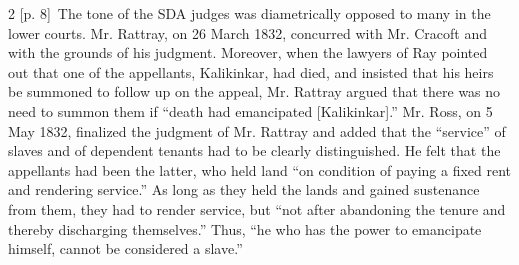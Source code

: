 \documentclass[10pt,a4paper]{article}
\begin{document}
\begin{paracol}{2}
\switchcolumn
{\scriptsize\color{gray} [p. 8]}\ The tone of the SDA judges was diametrically opposed to many in the lower courts. Mr. Rattray, on 26 March 1832, concurred with Mr. Cracoft and with the grounds of his judgment. Moreover, when the lawyers of Ray pointed out that one of the appellants, Kalikinkar, had died, and insisted that his heirs be summoned to follow up on the appeal, Mr. Rattray argued that there was no need to summon them if “death had emancipated [Kalikinkar].” Mr. Ross, on 5 May 1832, finalized the judgment of Mr. Rattray and added that the “service” of slaves and of dependent tenants had to be clearly distinguished. He felt that the appellants had been the latter, who held land “on condition of paying a fixed rent and rendering service.” As long as they held the lands and gained sustenance from them, they had to render service, but “not after abandoning the tenure and thereby discharging themselves.” Thus, “he who has the power to emancipate himself, cannot be considered a slave.”\par
\switchcolumn*

\end{paracol}
\end{document}

